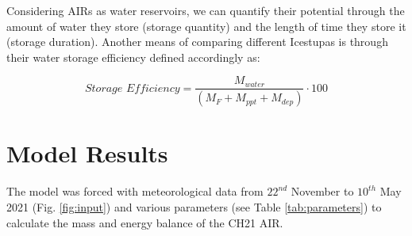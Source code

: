\documentclass[utf8]{frontiersSCNS} %
\begin{document}
Considering AIRs as water reservoirs, we can quantify their potential through the amount of water they store (storage
quantity) and the length of time they store it (storage duration). Another means of comparing different Icestupas is
through their water storage efficiency defined accordingly as:

\begin{equation} \textit{Storage Efficiency} = \frac{M_{water}}{(M_F+M_{ppt}+M_{dep})} \cdot 100 \end{equation}


\section{Model Results} 

The model was forced with meteorological data from $22^{nd}$ November to $10^{th}$ May 2021 (Fig.
\ref{fig:input}) and various parameters (see Table \ref{tab:parameters}) to calculate the mass and energy balance of
the CH21 AIR.
\end{document}
